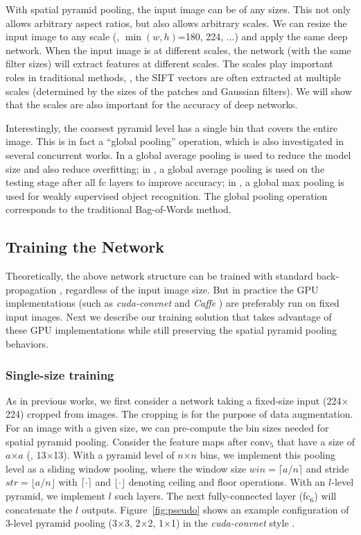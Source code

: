\documentclass[10pt,journal,cspaper,compsoc]{IEEEtran}
\begin{document}
With spatial pyramid pooling, the input image can be of any sizes. This not only allows arbitrary aspect ratios, but also allows arbitrary scales. We can resize the input image to any scale (\eg, $\min(w,h)$=180, 224, ...) and apply the same deep network. When the input image is at different scales, the network (with the same filter sizes) will extract features at different scales. The scales play important roles in traditional methods, \eg,
the SIFT vectors are often extracted at multiple scales \cite{Lowe2004,Chatfield2011} (determined by the sizes of the patches and Gaussian filters). We will show that the scales are also important for the accuracy of deep networks.

Interestingly, the coarsest pyramid level has a single bin that covers the entire image. This is in fact a ``global pooling'' operation, which is also investigated in several concurrent works. In \cite{Lin2013,Szegedy2014} a global average pooling is used to reduce the model size and also reduce overfitting; in \cite{Simonyan2014}, a global average pooling is used on the testing stage after all fc layers to improve accuracy; in \cite{Oquab2014}, a global max pooling is used for weakly supervised object recognition. The global pooling operation corresponds to the traditional Bag-of-Words method.

\subsection{Training the Network}

Theoretically, the above network structure can be trained with standard back-propagation \cite{LeCun1989}, regardless of the input image size. But in practice the GPU implementations (such as \emph{cuda-convnet} \cite{Krizhevsky2012} and \emph{Caffe} \cite{Jia2013}) are preferably run on fixed input images. Next we describe our training solution that takes advantage of these GPU implementations while still preserving the spatial pyramid pooling behaviors.

\subsubsection*{Single-size training}
As in previous works, we first consider a network taking a fixed-size input (224$\times$224) cropped from images. The cropping is for the purpose of data augmentation. For an image with a given size, we can pre-compute the bin sizes needed for spatial pyramid pooling. Consider the feature maps after conv$_5$ that have a size of $a$$\times$$a$ (\eg, 13$\times$13). With a pyramid level of $n$$\times$$n$ bins, we implement this pooling level as a sliding window pooling, where the window size $win=\lceil a/n \rceil$ and stride $str=\lfloor a/n \rfloor$ with $\lceil\cdot\rceil$ and $\lfloor\cdot\rfloor$ denoting ceiling and floor operations. With an $l$-level pyramid, we implement $l$ such layers. The next fully-connected layer (fc$_6$) will concatenate the $l$ outputs.
Figure~\ref{fig:pseudo} shows an example configuration of 3-level pyramid pooling (3$\times$3, 2$\times$2, 1$\times$1) in the \emph{cuda-convnet} style \cite{Krizhevsky2012}.
\end{document}
